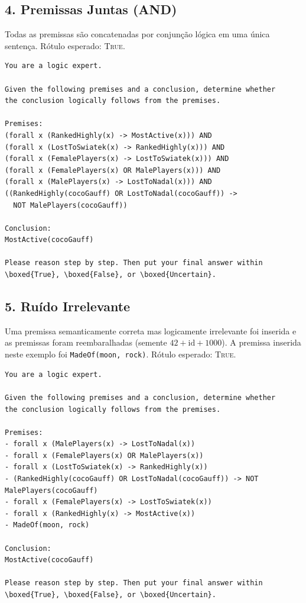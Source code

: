 \subsection{4. Premissas Juntas (AND)}
\label{ap:prompt-junto}

Todas as premissas são concatenadas por conjunção lógica em uma única
sentença. Rótulo esperado: \textsc{True}.

\begin{lstlisting}[caption={Prompt -- condição Premissas Juntas.},
                   label={lst:prompt-junto}]
You are a logic expert.

Given the following premises and a conclusion, determine whether
the conclusion logically follows from the premises.

Premises:
(forall x (RankedHighly(x) -> MostActive(x))) AND
(forall x (LostToSwiatek(x) -> RankedHighly(x))) AND
(forall x (FemalePlayers(x) -> LostToSwiatek(x))) AND
(forall x (FemalePlayers(x) OR MalePlayers(x))) AND
(forall x (MalePlayers(x) -> LostToNadal(x))) AND
((RankedHighly(cocoGauff) OR LostToNadal(cocoGauff)) ->
  NOT MalePlayers(cocoGauff))

Conclusion:
MostActive(cocoGauff)

Please reason step by step. Then put your final answer within
\boxed{True}, \boxed{False}, or \boxed{Uncertain}.
\end{lstlisting}

\subsection{5. Ruído Irrelevante}
\label{ap:prompt-irrelevant}

Uma premissa semanticamente correta mas logicamente irrelevante foi
inserida e as premissas foram reembaralhadas (semente $42 + \text{id} + 1000$).
A premissa inserida neste exemplo foi \texttt{MadeOf(moon, rock)}.
Rótulo esperado: \textsc{True}.

\begin{lstlisting}[caption={Prompt -- condição Ruído Irrelevante.},
                   label={lst:prompt-irrelevant}]
You are a logic expert.

Given the following premises and a conclusion, determine whether
the conclusion logically follows from the premises.

Premises:
- forall x (MalePlayers(x) -> LostToNadal(x))
- forall x (FemalePlayers(x) OR MalePlayers(x))
- forall x (LostToSwiatek(x) -> RankedHighly(x))
- (RankedHighly(cocoGauff) OR LostToNadal(cocoGauff)) -> NOT MalePlayers(cocoGauff)
- forall x (FemalePlayers(x) -> LostToSwiatek(x))
- forall x (RankedHighly(x) -> MostActive(x))
- MadeOf(moon, rock)

Conclusion:
MostActive(cocoGauff)

Please reason step by step. Then put your final answer within
\boxed{True}, \boxed{False}, or \boxed{Uncertain}.
\end{lstlisting}


